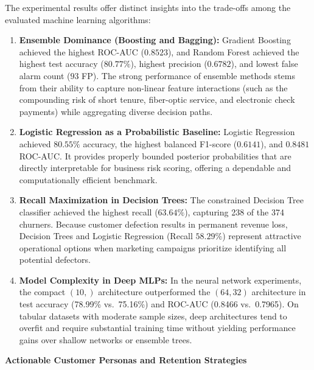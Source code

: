 \documentclass[12pt,oneside]{report}
\begin{document}
The experimental results offer distinct insights into the trade-offs among the evaluated machine learning algorithms:
\begin{enumerate}
    \item \textbf{Ensemble Dominance (Boosting and Bagging):} Gradient Boosting achieved the highest ROC-AUC ($0.8523$), and Random Forest achieved the highest test accuracy ($80.77\%$), highest precision ($0.6782$), and lowest false alarm count ($93$ FP). The strong performance of ensemble methods stems from their ability to capture non-linear feature interactions (such as the compounding risk of short tenure, fiber-optic service, and electronic check payments) while aggregating diverse decision paths.
    \item \textbf{Logistic Regression as a Probabilistic Baseline:} Logistic Regression achieved $80.55\%$ accuracy, the highest balanced F1-score ($0.6141$), and $0.8481$ ROC-AUC. It provides properly bounded posterior probabilities that are directly interpretable for business risk scoring, offering a dependable and computationally efficient benchmark.
    \item \textbf{Recall Maximization in Decision Trees:} The constrained Decision Tree classifier achieved the highest recall ($63.64\%$), capturing 238 of the 374 churners. Because customer defection results in permanent revenue loss, Decision Trees and Logistic Regression (Recall $58.29\%$) represent attractive operational options when marketing campaigns prioritize identifying all potential defectors.
    \item \textbf{Model Complexity in Deep MLPs:} In the neural network experiments, the compact $(10,)$ architecture outperformed the $(64, 32)$ architecture in test accuracy (78.99\% vs.\ 75.16\%) and ROC-AUC (0.8466 vs.\ 0.7965). On tabular datasets with moderate sample sizes, deep architectures tend to overfit and require substantial training time without yielding performance gains over shallow networks or ensemble trees.
\end{enumerate}

\textbf{Actionable Customer Personas and Retention Strategies}
\end{document}
